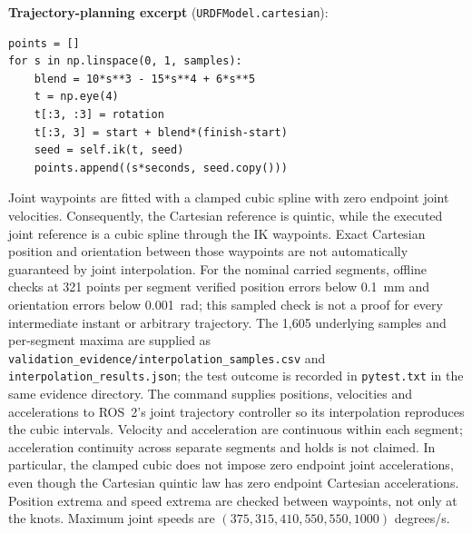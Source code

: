 \documentclass[10pt,a4paper]{article}
\begin{document}
\textbf{Trajectory-planning excerpt} (\texttt{URDFModel.cartesian}):
\begin{lstlisting}
points = []
for s in np.linspace(0, 1, samples):
    blend = 10*s**3 - 15*s**4 + 6*s**5
    t = np.eye(4)
    t[:3, :3] = rotation
    t[:3, 3] = start + blend*(finish-start)
    seed = self.ik(t, seed)
    points.append((s*seconds, seed.copy()))
\end{lstlisting}

Joint waypoints are fitted with a clamped cubic spline with zero endpoint
joint velocities. Consequently, the Cartesian reference is quintic, while
the executed joint reference is a cubic spline through the IK waypoints.
Exact Cartesian position and orientation between those waypoints are not
automatically guaranteed by joint interpolation. For the nominal carried
segments, offline checks at 321 points per segment verified position errors
below 0.1~mm and orientation errors below 0.001~rad; this sampled check is not
a proof for every intermediate instant or arbitrary trajectory.
The 1,605 underlying samples and per-segment maxima are supplied as
\texttt{validation\_evidence/interpolation\_samples.csv} and
\texttt{interpolation\_results.json}; the test outcome is recorded in
\texttt{pytest.txt} in the same evidence directory.
The command supplies positions, velocities and
accelerations to ROS~2's joint trajectory controller so its
interpolation reproduces the cubic intervals. Velocity and acceleration are
continuous within each segment; acceleration continuity across separate
segments and holds is not claimed. In particular, the clamped cubic does not
impose zero endpoint joint accelerations, even though the Cartesian quintic
law has zero endpoint Cartesian accelerations. Position extrema and speed extrema are
checked between waypoints, not only at the knots. Maximum joint speeds are
$(375,315,410,550,550,1000)$ degrees/s.
\end{document}
